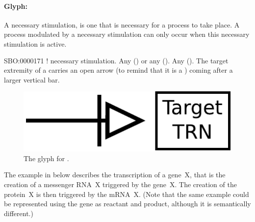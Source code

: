 
\paragraph{Glyph: }\label{sec:necessary_stim}

A necessary stimulation, is one that is necessary for a process to take place. A process modulated by a necessary stimulation can only occur when this necessary stimulation is active.

\begin{glyphDescription}
 \glyphSboTerm SBO:0000171 ! necessary stimulation.
 \glyphOrigin Any  () or any  ().
 \glyphTarget Any  ().
 \glyphNode The target extremity of a  carries an open arrow (to remind that it is a ) coming after a larger vertical bar.
 \end{glyphDescription}

\begin{figure}[H]
  \centering
  \includegraphics[scale = 0.5]{images/necessary_stim}
  \caption{The \PD glyph for .}
  \label{fig:Necessary Stimulation}
\end{figure}

The example in  below describes the transcription of a gene~X, that is the creation of a messenger RNA~X triggered by the gene~X.  The creation of the protein~X is then triggered by the mRNA~X.  (Note that the same example could be represented using the gene as reactant and product, although it is semantically different.)

